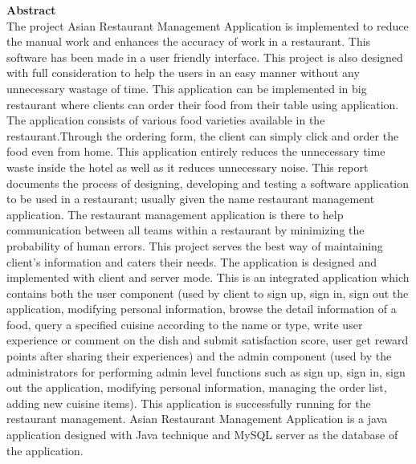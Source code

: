 \documentclass[12pt,a4paper]{article}
\newcommand\tab[1][.7cm]{\hspace*{#1}}
\begin{document}
	\begin{titlepage}
	\vspace*{.05cm}	
		\thispagestyle{fancy}
		\centering 
		{\fontsize{16}{10}\selectfont \textbf{Abstract}}\\
		\vspace{0.6cm}
		\justify \tab  The project Asian Restaurant Management Application is implemented to reduce the
manual work and enhances the accuracy of work in a restaurant. This software has been made
in a user friendly interface. This project is also designed with full consideration to help the
users in an easy manner without any unnecessary wastage of time. This application can be
implemented in big restaurant where clients can order their food from their table using
application. The application consists of various food varieties available in the restaurant.Through the ordering form, the client can simply click and order the food even from
home. This application entirely reduces the unnecessary time waste inside the hotel as well as
it reduces unnecessary noise. This report documents the process of designing, developing and
testing a software application to be used in a restaurant; usually given the name restaurant
management application. The restaurant management application is there to help
communication between all teams within a restaurant by minimizing the probability of human
errors. This project serves the best way of maintaining client’s information and caters
their needs. The application is designed and implemented with client and server mode. This is
an integrated application which contains both the user component (used by client to sign up,
sign in, sign out the application, modifying personal information, browse the detail
information of a food, query a specified cuisine according to the name or type, write user
experience or comment on the dish and submit satisfaction score, user get reward points after
sharing their experiences) and the admin component (used by the administrators for
performing admin level functions such as sign up, sign in, sign out the application, modifying
personal information, managing the order list, adding new cuisine items). This application is
successfully running for the restaurant management. Asian Restaurant Management
Application is a java application designed with Java technique and MySQL server as the
database of the application.\\


\end{titlepage}
\end{document}
